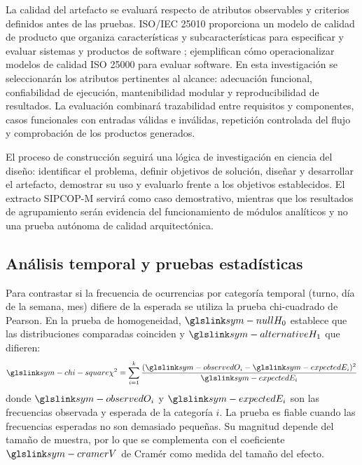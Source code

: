 La calidad del artefacto se evaluará respecto de atributos observables y criterios definidos antes de las pruebas. ISO/IEC 25010 proporciona un modelo de calidad de producto que organiza características y subcaracterísticas para especificar y evaluar sistemas y productos de software \citep{iso25010_2023}; \citet{argotti2024quality} ejemplifican cómo operacionalizar modelos de calidad ISO 25000 para evaluar software. En esta investigación se seleccionarán los atributos pertinentes al alcance: adecuación funcional, confiabilidad de ejecución, mantenibilidad modular y reproducibilidad de resultados. La evaluación combinará trazabilidad entre requisitos y componentes, casos funcionales con entradas válidas e inválidas, repetición controlada del flujo y comprobación de los productos generados.

El proceso de construcción seguirá una lógica de investigación en ciencia del diseño: identificar el problema, definir objetivos de solución, diseñar y desarrollar el artefacto, demostrar su uso y evaluarlo frente a los objetivos establecidos. El extracto SIPCOP-M servirá como caso demostrativo, mientras que los resultados de agrupamiento serán evidencia del funcionamiento de módulos analíticos y no una prueba autónoma de calidad arquitectónica.

\subsection{Análisis temporal y pruebas estadísticas}

Para contrastar si la frecuencia de ocurrencias por categoría temporal (turno, día de la semana, mes) difiere de la esperada se utiliza la prueba chi-cuadrado de Pearson. En la prueba de homogeneidad, $\symref{sym-null}{H_0}$ establece que las distribuciones comparadas coinciden y $\symref{sym-alternative}{H_1}$ que difieren:
\begin{equation}
\symref{sym-chi-square}{\chi^{2}} = \sum_{i=1}^{k} \frac{(\symref{sym-observed}{O_i} - \symref{sym-expected}{E_i})^{2}}{\symref{sym-expected}{E_i}}
\label{eq:chi2}
\eqtitulo{Estadístico chi-cuadrado de Pearson.}
\end{equation}
donde $\symref{sym-observed}{O_i}$ y $\symref{sym-expected}{E_i}$ son las frecuencias observada y esperada de la categoría $i$. La prueba es fiable cuando las frecuencias esperadas no son demasiado pequeñas. Su magnitud depende del tamaño de muestra, por lo que se complementa con el coeficiente $\symref{sym-cramer}{V}$ de Cramér como medida del tamaño del efecto.

